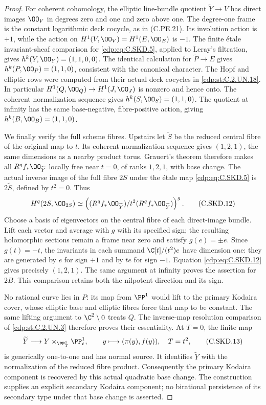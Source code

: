 \begin{proof}
For coherent cohomology, the elliptic
line-bundle quotient $\widetilde Y\to V$
has direct images $\OO_V$ in degrees
zero and one and zero above one. The
degree-one frame is the constant
logarithmic deck cocycle, as in
(C.PE.21). Its involution action is
$+1$, while the action on
$H^1(V,\OO_V)=H^1(E,\OO_E)$ is $-1$.
The finite \'etale invariant-sheaf
comparison for \eqref{cdp:eq:C.SKD.5}, applied to
Leray's filtration, gives
$h^k(Y,\OO_Y)=(1,1,0,0)$. The identical
calculation for $\widetilde P\to E$
gives $h^k(P,\OO_P)=(1,1,0)$, consistent
with the canonical character.
The Hopf and elliptic rows were
computed from their actual deck cocycles
in \ref{cdp:st:C.2.UN.18}. In particular
$H^1(Q,\OO_Q)\to H^1(J,\OO_J)$ is
nonzero and hence onto. The coherent
normalization sequence gives
$h^k(S,\OO_S)=(1,1,0)$. The quotient
at infinity has the same base-negative,
fibre-positive action, giving
$h^k(B,\OO_B)=(1,1,0)$.

We finally verify the full scheme fibres.
Upstairs let $\widetilde S$ be the
reduced central fibre of the original
map to $t$. Its coherent normalization
sequence gives $(1,2,1)$, the same
dimensions as a nearby product torus.
Grauert's theorem therefore makes all
$R^qf_*\OO_{\widetilde Y}$ locally free
near $t=0$, of ranks $1,2,1$, with
base change. The actual inverse image
of the full fibre $2S$ under the
\'etale map \eqref{cdp:eq:C.SKD.5} is $2\widetilde S$,
defined by $t^2=0$. Thus
\[
 H^q(2S,\OO_{2S})
  \simeq
 \left((R^qf_*\OO_{\widetilde Y})/
                   t^2(R^qf_*\OO_{\widetilde Y})\right)^g .
                                                            \tag{C.SKD.12}\label{cdp:eq:C.SKD.12}
\]
Choose a basis of eigenvectors on the
central fibre of each direct-image
bundle. Lift each vector and average
with $g$ with its specified sign; the
resulting holomorphic sections remain
a frame near zero and satisfy
$g(e)=\pm e$. Since $g(t)=-t$, the
invariants in each summand
$\C[t]/(t^2)e$ have dimension one:
they are generated by $e$ for sign
$+1$ and by $te$ for sign $-1$.
Equation \eqref{cdp:eq:C.SKD.12} gives precisely
$(1,2,1)$. The same argument at
infinity proves the assertion for
$2B$. This comparison retains both
the nilpotent direction and its sign.

No rational curve lies in $P$:
its map from $\PP^1$ would lift to
the primary Kodaira cover, whose
elliptic base and elliptic fibres
force that map to be constant.
The same lifting argument to
$\C^2\setminus0$ treats $Q$.
The inverse-map resolution comparison
of \ref{cdp:st:C.2.UN.3} therefore proves their
essentiality. At $T=0$, the finite
map
\[
 \widetilde Y\longrightarrow
             Y\times_{\PP^1_T}\PP^1_t,\qquad
 y\longmapsto(\pi(y),f(y)),\quad T=t^2,
                                                            \tag{C.SKD.13}\label{cdp:eq:C.SKD.13}
\]
is generically one-to-one and has
normal source. It identifies
$\widetilde Y$ with the normalization
of the reduced fibre product.
Consequently the primary Kodaira
component is recovered by this
actual quadratic base change.
The construction supplies an
explicit secondary Kodaira component;
no birational persistence of its
secondary type under that base change
is asserted.
\end{proof}


